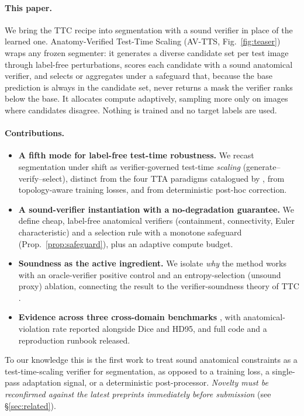 \documentclass[10pt]{article}
\begin{document}
\paragraph{This paper.} We bring the TTC recipe into segmentation with a sound verifier in place of the learned one. Anatomy-Verified Test-Time Scaling (AV-TTS, Fig.~\ref{fig:teaser}) wraps any frozen segmenter: it generates a diverse candidate set per test image through label-free perturbations, scores each candidate with a sound anatomical verifier, and selects or aggregates under a safeguard that, because the base prediction is always in the candidate set, never returns a mask the verifier ranks below the base. It allocates compute adaptively, sampling more only on images where candidates disagree. Nothing is trained and no target labels are used.

\paragraph{Contributions.}
\begin{itemize}\setlength\itemsep{0.15em}
\item \textbf{A fifth mode for label-free test-time robustness.} We recast segmentation under shift as verifier-governed test-time \emph{scaling} (generate--verify--select), distinct from the four TTA paradigms catalogued by \citet{yu2025medsegtta}, from topology-aware training losses, and from deterministic post-hoc correction.
\item \textbf{A sound-verifier instantiation with a no-degradation guarantee.} We define cheap, label-free anatomical verifiers (containment, connectivity, Euler characteristic) and a selection rule with a monotone safeguard (Prop.~\ref{prop:safeguard}), plus an adaptive compute budget.
\item \textbf{Soundness as the active ingredient.} We isolate \emph{why} the method works with an oracle-verifier positive control and an entropy-selection (unsound proxy) ablation, connecting the result to the verifier-soundness theory of TTC \citep{stroebl2024verifier,setlur2025verifier}.
\item \textbf{Evidence across three cross-domain benchmarks} , with anatomical-violation rate reported alongside Dice and HD95, and full code and a reproduction runbook released.
\end{itemize}
To our knowledge this is the first work to treat sound anatomical constraints as a test-time-scaling verifier for segmentation, as opposed to a training loss, a single-pass adaptation signal, or a deterministic post-processor. \emph{Novelty must be reconfirmed against the latest preprints immediately before submission} (see \S\ref{sec:related}).
\end{document}
